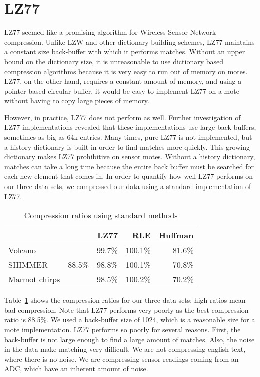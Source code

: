 \section{LZ77}

LZ77 \cite{lz77} seemed like a promising algorithm for Wireless Sensor
Network compression. Unlike LZW \cite{lzw} and other dictionary
building schemes, LZ77 maintains a constant size back-buffer with
which it performs matches. Without an upper bound on the dictionary
size, it is unreasonable to use dictionary based compression
algorithms because it is very easy to run out of memory on
motes. LZ77, on the other hand, requires a constant amount of memory,
and using a pointer based circular buffer, it would be easy to
implement LZ77 on a mote without having to copy large pieces of
memory.

However, in practice, LZ77 does not perform as well. Further
investigation of LZ77 implementations revealed that these
implementations use large back-buffers, sometimes as big as 64k
entries. Many times, pure LZ77 is not implemented, but a history
dictionary is built in order to find matches more quickly. This
growing dictionary makes LZ77 prohibitive on sensor motes. Without a
history dictionary, matches can take a long time because the entire
back buffer must be searched for each new element that comes in. In
order to quantify how well LZ77 performs on our three data sets, we
compressed our data using a standard implementation of LZ77.

\begin{table}
  \begin{center}
  \begin{tabular}{|l||r|r|r|}
    \hline
    & LZ77 & RLE & Huffman \\ \hline
    Volcano & 99.7\% & 100.1\% & 81.6\% \\ \hline
    SHIMMER & 88.5\% - 98.8\% & 100.1\% & 70.8\% \\ \hline
    Marmot chirps & 98.5\% & 100.2\% & 70.2\% \\ \hline
    
  \end{tabular}
  \end{center}
  \caption{Compression ratios using standard methods}
  \label{table:compratios}
\end{table}

Table~\ref{table:compratios} shows the compression ratios for our
three data sets; high ratios mean bad compression. Note that LZ77
performs very poorly as the best compression ratio is 88.5\%. We used
a back-buffer size of 1024, which is a reasonable size for a mote
implementation. LZ77 performs so poorly for several reasons. First,
the back-buffer is not large enough to find a large amount of
matches. Also, the noise in the data make matching very difficult. We
are not compressing english text, where there is no noise. We are
compressing sensor readings coming from an ADC, which have an inherent
amount of noise. 

